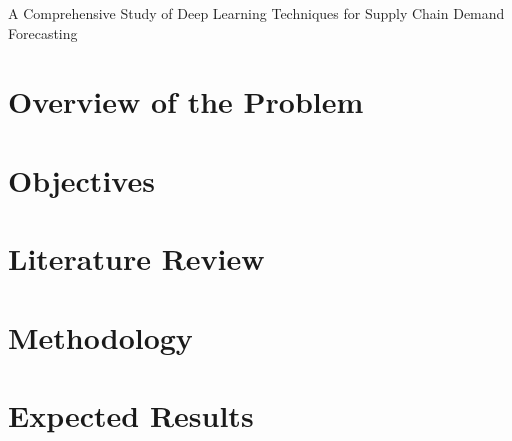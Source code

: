 \documentclass[fontsize=11pt,paper=a4]{scrartcl}
\newcommand{\tltle}{A Comprehensive Study of Deep Learning Techniques for Supply Chain Demand Forecasting}
\begin{document}
\newpage
\maketitle

\newpage
\begin{spacing}{1}
    
\end{spacing}
\newpage


\begin{center}
  \Large \tltle
\end{center}

\vspace{0.3in}
\noindent

\section{Overview of the Problem}
\begin{spacing}{1}
    
\end{spacing}

\section{Objectives}
\begin{spacing}{1}
    
\end{spacing}

\section{Literature Review}
\begin{spacing}{1}
    
\end{spacing}

\section{Methodology}
\begin{spacing}{1}
    
\end{spacing}

\section{Expected Results}
\begin{spacing}{1}
    
\end{spacing}

\printbibliography
\end{document}
